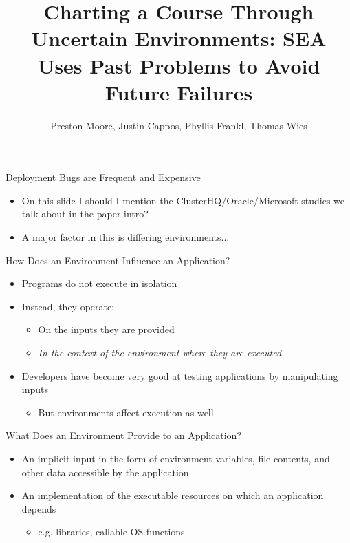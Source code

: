 \documentclass[pdf]{beamer}
\title{Charting a Course Through Uncertain Environments: SEA Uses Past
Problems to Avoid Future Failures}
\author{Preston Moore, Justin Cappos, Phyllis Frankl, Thomas Wies}
\begin{document}
\begin{frame}
  \titlepage{}
\end{frame}


\begin{frame}{Deployment Bugs are Frequent and Expensive}
  \begin{itemize}
    \item{On this slide I should I mention the ClusterHQ/Oracle/Microsoft
      studies we talk about in the paper intro?}
    \item{A major factor in this is differing environments...}
  \end{itemize}
\end{frame}

\begin{frame}{How Does an Environment Influence an Application?}
  \begin{itemize}
  \item{Programs do not execute in isolation}
  \item{Instead, they operate:}
    \begin{itemize}
    \item{On the inputs they are provided}
    \item{\textit{In the context of the environment where they are executed}}
    \end{itemize}
    \item{Developers have become very good at testing applications by
        manipulating inputs}
      \begin{itemize}
        \item{But environments affect execution as well}
      \end{itemize}
  \end{itemize}
\end{frame}


\begin{frame}{What Does an Environment Provide to an Application?}
  \begin{itemize}
  \item{An implicit input in the form of environment variables, file
      contents, and other data accessible by the application}
  \item{An implementation of the executable resources on which an application depends}
    \begin{itemize}
    \item{e.g. libraries, callable OS functions}
    \end{itemize}
  \end{itemize}
\end{frame}
\end{document}
